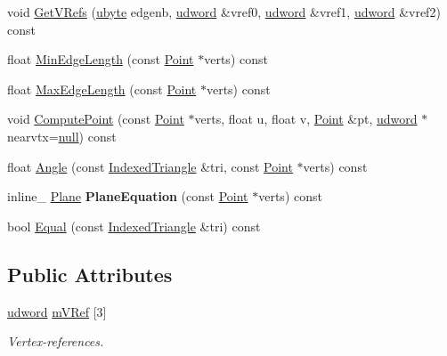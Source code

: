 \begin{DoxyCompactItemize}
\item 
void \hyperlink{classOpcode_1_1IndexedTriangle_a8aa9652bf4799555773d2ecdf3da3291}{Get\+V\+Refs} (\hyperlink{IceTypes_8h_a5dd4f281954ce1405c92d62a427f839a}{ubyte} edgenb, \hyperlink{IceTypes_8h_a44c6f1920ba5551225fb534f9d1a1733}{udword} \&vref0, \hyperlink{IceTypes_8h_a44c6f1920ba5551225fb534f9d1a1733}{udword} \&vref1, \hyperlink{IceTypes_8h_a44c6f1920ba5551225fb534f9d1a1733}{udword} \&vref2) const 
\item 
float \hyperlink{classOpcode_1_1IndexedTriangle_a6b2352d5b214898c58f5c5bca7a360ec}{Min\+Edge\+Length} (const \hyperlink{classOpcode_1_1Point}{Point} $\ast$verts) const 
\item 
float \hyperlink{classOpcode_1_1IndexedTriangle_abad2f26ec2a8cee0c2753d094e87fb9c}{Max\+Edge\+Length} (const \hyperlink{classOpcode_1_1Point}{Point} $\ast$verts) const 
\item 
void \hyperlink{classOpcode_1_1IndexedTriangle_a4acfb3e8e81f5b8d7b59365d8d0d1897}{Compute\+Point} (const \hyperlink{classOpcode_1_1Point}{Point} $\ast$verts, float u, float v, \hyperlink{classOpcode_1_1Point}{Point} \&pt, \hyperlink{IceTypes_8h_a44c6f1920ba5551225fb534f9d1a1733}{udword} $\ast$nearvtx=\hyperlink{IceTypes_8h_ac97b8ee753e4405397a42ad5799b0f9e}{null}) const 
\item 
float \hyperlink{classOpcode_1_1IndexedTriangle_a876ee32ea917ca66141fe867a29ecbb4}{Angle} (const \hyperlink{classOpcode_1_1IndexedTriangle}{Indexed\+Triangle} \&tri, const \hyperlink{classOpcode_1_1Point}{Point} $\ast$verts) const 
\item 
inline\+\_\+ \hyperlink{classOpcode_1_1Plane}{Plane} {\bfseries Plane\+Equation} (const \hyperlink{classOpcode_1_1Point}{Point} $\ast$verts) const \hypertarget{classOpcode_1_1IndexedTriangle_a7d2d53f0f0d9abefacd86c565adfc153}{}\label{classOpcode_1_1IndexedTriangle_a7d2d53f0f0d9abefacd86c565adfc153}

\item 
bool \hyperlink{classOpcode_1_1IndexedTriangle_a15b576c437f90be4d6b9e015006deb75}{Equal} (const \hyperlink{classOpcode_1_1IndexedTriangle}{Indexed\+Triangle} \&tri) const 
\end{DoxyCompactItemize}
\subsection*{Public Attributes}
\begin{DoxyCompactItemize}
\item 
\hyperlink{IceTypes_8h_a44c6f1920ba5551225fb534f9d1a1733}{udword} \hyperlink{classOpcode_1_1IndexedTriangle_a783082e89cfdb575022958e3c1083676}{m\+V\+Ref} \mbox{[}3\mbox{]}\hypertarget{classOpcode_1_1IndexedTriangle_a783082e89cfdb575022958e3c1083676}{}\label{classOpcode_1_1IndexedTriangle_a783082e89cfdb575022958e3c1083676}

\begin{DoxyCompactList}\small\item\em Vertex-\/references. \end{DoxyCompactList}\end{DoxyCompactItemize}


